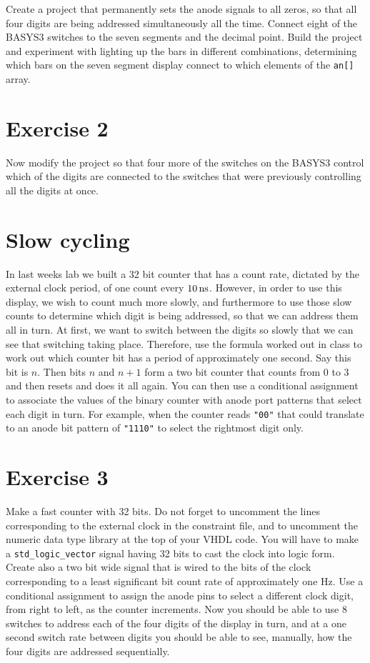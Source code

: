 \documentclass[../physical_computing.tex]{subfiles}
\begin{document}
 Create a project that permanently sets the anode signals to all zeros, so that all four digits are being addressed simultaneously all the time. Connect eight of the BASYS3 switches to the seven segments and the decimal point. Build the project and experiment with lighting up the bars in different combinations, determining which bars on the seven segment display connect to which elements of the \texttt{an[]} array.

\section{Exercise 2}
\label{sec:varydigit}

Now modify the project so that four more of the switches on the BASYS3 control which of the digits are connected to the switches that were previously controlling all the digits at once.

\section{Slow cycling}
\label{sec:slowcycle}

In last weeks lab we built a 32 bit counter that has a count rate, dictated by the external clock period, of one count every $\rm 10\,ns$. However, in order to use this display, we wish to count much more slowly, and furthermore to use those slow counts to determine which digit is being addressed, so that we can address them all in turn. At first, we want to switch between the digits so slowly that we can see that switching taking place. Therefore, use the formula worked out in class to work out which counter bit has a period of approximately one second. Say this bit is $n$. Then bits $n$ and $n+1$ form a two bit counter that counts from $0$ to $3$ and then resets and does it all again. You can then use a conditional assignment to associate the values of the binary counter with anode port patterns that select each digit in turn. For example, when the counter reads \texttt{"00"} that could translate to an anode bit pattern of \texttt{"1110"} to select the rightmost digit only.
    
\section{Exercise 3}
\label{sec:slowcycle}

Make a fast counter with 32 bits. Do not forget to uncomment the lines corresponding to the external clock in the constraint file, and to uncomment the numeric data type library at the top of your VHDL code. You will have to make a \texttt{std\_logic\_vector} signal having 32 bits to cast the clock into logic form. Create also a two bit wide signal that is wired to the bits of the clock corresponding to a least significant bit count rate of approximately one Hz. Use a conditional assignment to assign the anode pins to select a different clock digit, from right to left, as the counter increments. Now you should be able to use 8 switches to address each of the four digits of the display in turn, and at a one second switch rate between digits you should be able to see, manually, how the four digits are addressed sequentially.
\end{document}
